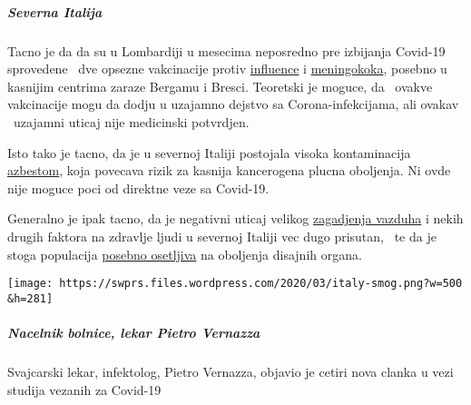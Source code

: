 \hypertarget{severna-italija}{%
\subparagraph{\texorpdfstring{\textbf{Severna
Italija}}{Severna Italija}}\label{severna-italija}}

Tacno je da da su u Lombardiji u mesecima neposredno pre izbijanja
Covid-19 sprovedene ~dve opsezne vakcinacije protiv
\href{https://www.bergamonews.it/2019/10/21/vaccinazione-antinfluenzale-a-bergamo-ordinate-185-000-dosi-di-vaccino/332164/}{influence}
i
\href{https://www.bsnews.it/2020/01/18/meningite-vaccinate-34mila-persone-tra-brescia-e-bergamo/}{meningokoka},
posebno u kasnijim centrima zaraze Bergamu i Bresci. Teoretski je
moguce, da ~ovakve vakcinacije mogu da dodju u uzajamno dejstvo sa
Corona-infekcijama, ali ovakav ~uzajamni uticaj nije medicinski
potvrdjen.

Isto tako je tacno, da je u severnoj Italiji postojala visoka
kontaminacija
\href{https://www.spiegel.de/panorama/justiz/asbest-prozess-in-italien-nun-sind-alle-krank-a-666421.html}{azbestom},
koja povecava rizik za kasnija kancerogena plucna oboljenja. Ni ovde
nije moguce poci od direktne veze sa Covid-19.

Generalno je ipak tacno, da je negativni uticaj velikog
\href{https://www.heise.de/tp/features/Feinstaubpartikel-als-Viren-Vehikel-4687454.html}{zagadjenja
vazduha} i nekih drugih faktora na zdravlje ljudi u severnoj Italiji vec
dugo prisutan, ~te da je stoga populacija
\href{https://www.srf.ch/news/international/massive-schadstoffbelastung-nirgendwo-erkranken-so-viele-wegen-smog-wie-in-norditalien}{posebno
osetljiva} na oboljenja disajnih organa.

\texttt{[image: https://swprs.files.wordpress.com/2020/03/italy-smog.png?w=500\\\&h=281]}

\hypertarget{nacelnik-bolnice-lekar-pietro-vernazza}{%
\subparagraph{\texorpdfstring{\textbf{Nacelnik bolnice, lekar Pietro
Vernazza}}{Nacelnik bolnice, lekar Pietro Vernazza}}\label{nacelnik-bolnice-lekar-pietro-vernazza}}

Svajcarski lekar, infektolog, Pietro Vernazza, objavio je cetiri nova
clanka u vezi studija vezanih za Covid-19

